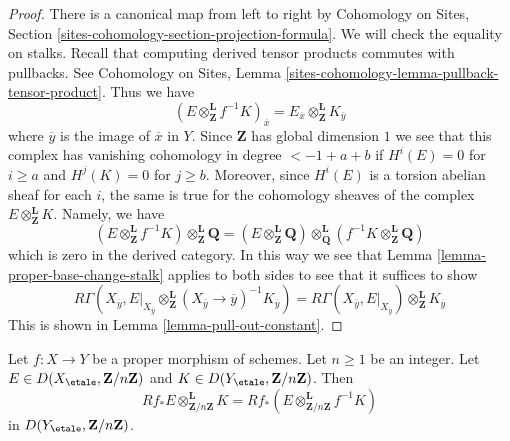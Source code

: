 \begin{proof}
There is a canonical map from left to right by
Cohomology on Sites, Section \ref{sites-cohomology-section-projection-formula}.
We will check the equality on stalks.
Recall that computing derived tensor products commutes with pullbacks.
See Cohomology on Sites, Lemma
\ref{sites-cohomology-lemma-pullback-tensor-product}.
Thus we have
$$
(E \otimes_\mathbf{Z}^\mathbf{L} f^{-1}K)_{\overline{x}}
=
E_{\overline{x}} \otimes_\mathbf{Z}^\mathbf{L} K_{\overline{y}}
$$
where $\overline{y}$ is the image of $\overline{x}$ in $Y$.
Since $\mathbf{Z}$ has global dimension $1$ we see that
this complex has vanishing cohomology in degree $< - 1 + a + b$
if $H^i(E) = 0$ for $i \geq a$ and $H^j(K) = 0$ for $j \geq b$.
Moreover, since $H^i(E)$ is a torsion abelian
sheaf for each $i$, the same is true for the cohomology
sheaves of the complex $E \otimes_\mathbf{Z}^\mathbf{L} K$.
Namely, we have
$$
(E \otimes_\mathbf{Z}^\mathbf{L} f^{-1}K)
\otimes_{\mathbf{Z}}^\mathbf{L} \mathbf{Q} =
(E \otimes_\mathbf{Z}^\mathbf{L} \mathbf{Q})
\otimes_{\mathbf{Q}}^\mathbf{L}
(f^{-1}K \otimes_{\mathbf{Z}}^\mathbf{L} \mathbf{Q})
$$
which is zero in the derived category.
In this way we see that Lemma \ref{lemma-proper-base-change-stalk}
applies to both sides to see that it suffices to show
$$
R\Gamma(X_{\overline{y}},
E|_{X_{\overline{y}}} \otimes_\mathbf{Z}^\mathbf{L}
(X_{\overline{y}} \to \overline{y})^{-1}K_{\overline{y}}) =
R\Gamma(X_{\overline{y}},
E|_{X_{\overline{y}}}) \otimes_\mathbf{Z}^\mathbf{L} K_{\overline{y}}
$$
This is shown in Lemma \ref{lemma-pull-out-constant}.
\end{proof}

\begin{lemma}
\label{lemma-projection-formula-proper-mod-n}
Let $f : X \to Y$ be a proper morphism of schemes. Let $n \geq 1$ be
an integer. Let $E \in D(X_\etale, \mathbf{Z}/n\mathbf{Z})$ and
$K \in D(Y_\etale, \mathbf{Z}/n\mathbf{Z})$. Then
$$
Rf_*E \otimes_{\mathbf{Z}/n\mathbf{Z}}^\mathbf{L} K =
Rf_*(E \otimes_{\mathbf{Z}/n\mathbf{Z}}^\mathbf{L} f^{-1}K)
$$
in $D(Y_\etale, \mathbf{Z}/n\mathbf{Z})$.
\end{lemma}

